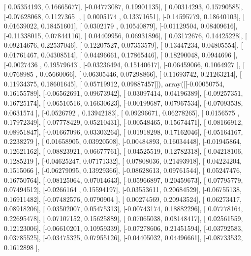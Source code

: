 \documentclass{article}
\begin{document}
       [ 0.05354193,  0.16665677],
       [-0.04773087,  0.19901135],
       [ 0.00314293,  0.15790585],
       [-0.07628068,  0.1127365 ],
       [ 0.0005174 ,  0.13371651],
       [-0.14595779,  0.18640103],
       [ 0.01639022,  0.18451601],
       [ 0.0302179 ,  0.10540879],
       [-0.01129504,  0.08409616],
       [-0.11338015,  0.07844116],
       [ 0.04409956,  0.06931896],
       [ 0.03172676,  0.14425228],
       [ 0.09214676,  0.22537046],
       [ 0.12207527,  0.07353579],
       [ 0.13447234,  0.04805554],
       [ 0.01761467,  0.04308514],
       [ 0.04496661,  0.17865446],
       [ 0.18290048,  0.0944696 ],
       [-0.0027436 ,  0.19579643],
       [-0.03236494,  0.15140617],
       [-0.06459066,  0.1064927 ],
       [ 0.0768985 ,  0.05660066],
       [ 0.06305446,  0.07298866],
       [ 0.11693742,  0.21263214],
       [ 0.11934375,  0.18601645],
       [ 0.05719912,  0.09887457]]), array([[-0.00050754,  0.16155789],
       [-0.06562691,  0.09673942],
       [ 0.03097414,  0.04196389],
       [-0.09257351,  0.16725174],
       [ 0.06510516,  0.16630623],
       [-0.00199687,  0.07967534],
       [-0.07093538,  0.0631574 ],
       [-0.0526792 ,  0.13942183],
       [ 0.09296671,  0.06278265],
       [ 0.0156575 ,  0.17972349],
       [ 0.07778429,  0.05210431],
       [-0.00548465,  0.15674471],
       [ 0.08166912,  0.08951847],
       [-0.01667096,  0.03303264],
       [ 0.01918298,  0.17162046],
       [-0.05164167,  0.2238279 ],
       [ 0.01658905,  0.03920508],
       [-0.00484893,  0.16034448],
       [-0.01945864,  0.12621162],
       [ 0.08823921,  0.06677761],
       [ 0.04525519,  0.12782318],
       [ 0.04218106,  0.1285219 ],
       [-0.04625247,  0.07171332],
       [ 0.07808036,  0.21493918],
       [ 0.04224204,  0.1515066 ],
       [-0.06279095,  0.13929366],
       [-0.08628613,  0.09761544],
       [ 0.05247476,  0.16750764],
       [-0.08125064,  0.07014643],
       [-0.05966897,  0.20459673],
       [ 0.07795779,  0.07494512],
       [-0.0266164 ,  0.15594197],
       [-0.03553611,  0.20684529],
       [-0.06755138,  0.16911482],
       [-0.07482576,  0.0790904 ],
       [ 0.00274569,  0.20943524],
       [ 0.06273417,  0.08918206],
       [ 0.03502007,  0.05475313],
       [-0.00743174,  0.18882296],
       [ 0.07778164,  0.22695478],
       [ 0.07107152,  0.15625889],
       [ 0.07065038,  0.08148417],
       [ 0.02561559,  0.12123006],
       [-0.06610201,  0.10959339],
       [-0.07278606,  0.21451594],
       [-0.03792583,  0.03785525],
       [-0.03475325,  0.07955126],
       [-0.04405032,  0.04496661],
       [-0.08733532,  0.1612898 ],
\end{document}

